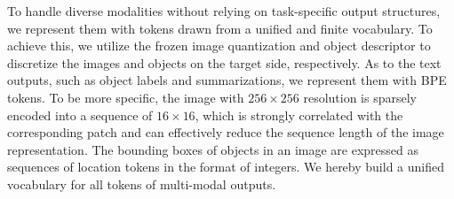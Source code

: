 \documentclass[10pt]{article} \usepackage[preprint]{tmlr}
\begin{document}
To handle diverse modalities without relying on task-specific output structures, we represent them with tokens drawn from a unified and finite vocabulary. To achieve this, we utilize the frozen image quantization \citep{van2017neural, esser2021taming} and object descriptor \citep{chen2022pixseq, chen2022unified} to discretize the images and objects on the target side, respectively. As to the text outputs, such as object labels and summarizations, we represent them with BPE tokens. To be more specific, the image with $256 \times 256$ resolution is sparsely encoded into a sequence of $16 \times 16$, which is strongly correlated with the corresponding patch \citep{bao2021beit} and can effectively reduce the sequence length of the image representation. The bounding boxes of objects in an image are expressed as sequences of location tokens in the format of integers. We hereby build a unified vocabulary for all tokens of multi-modal outputs.
\end{document}
